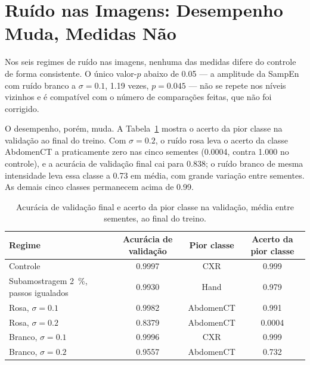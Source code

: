 \section{Ruído nas Imagens: Desempenho Muda, Medidas Não}
\label{sec:R-ruido-imagem}

Nos seis regimes de ruído nas imagens, nenhuma das medidas difere do controle
de forma consistente. O único valor-$p$ abaixo de \num{0,05} --- a amplitude da
SampEn com ruído branco a $\sigma = \num{0,1}$, \num{1,19} vezes,
$p = \num{0,045}$ --- não se repete nos níveis vizinhos e é compatível com o
número de comparações feitas, que não foi corrigido.

O desempenho, porém, muda. A Tabela~\ref{tab:acerto-classe} mostra o acerto da
pior classe na validação ao final do treino. Com $\sigma = \num{0,2}$, o ruído
rosa leva o acerto da classe AbdomenCT a praticamente zero nas cinco sementes
(\num{0,0004}, contra \num{1,000} no controle), e a acurácia de validação final
cai para \num{0,838}; o ruído branco de mesma intensidade leva essa classe a
\num{0,73} em média, com grande variação entre sementes. As demais cinco
classes permanecem acima de \num{0,99}.

\begin{table}[H]
    \centering
    \caption{Acurácia de validação final e acerto da pior classe na validação,
    média entre sementes, ao final do treino.}
    \label{tab:acerto-classe}
    \footnotesize
    \begin{tabular}{lccc}
        \toprule
        Regime & Acurácia de validação & Pior classe & Acerto da pior classe \\
        \midrule
        Controle                     & \num{0,9997} & CXR       & \num{0,999} \\
        Subamostragem \SI{2}{\percent}, passos igualados & \num{0,9930} & Hand & \num{0,979} \\
        Rosa, $\sigma = \num{0,1}$   & \num{0,9982} & AbdomenCT & \num{0,991} \\
        Rosa, $\sigma = \num{0,2}$   & \num{0,8379} & AbdomenCT & \num{0,0004} \\
        Branco, $\sigma = \num{0,1}$ & \num{0,9996} & CXR       & \num{0,999} \\
        Branco, $\sigma = \num{0,2}$ & \num{0,9557} & AbdomenCT & \num{0,732} \\
        \bottomrule
    \end{tabular}
\end{table}


